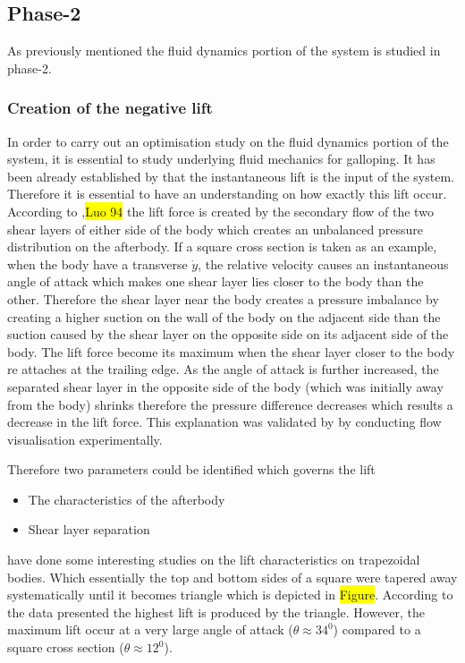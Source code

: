 \documentclass{article}
\newcommand{\hilight}[1]{\colorbox{yellow}{#1}}
\begin{document}
\subsection{Phase-2}

As previously mentioned the fluid dynamics portion of the system is studied in phase-2.

\subsubsection{Creation of the negative lift}

In order to carry out an optimisation study on the fluid dynamics portion of the system, it is essential to study underlying fluid mechanics for galloping. It has been already established by \cite{Parkinson1964} that the instantaneous lift is the input of the system. Therefore it is essential to have an understanding on how exactly this lift occur. According to \cite{Parkinson1989},\hilight{Luo 94} the lift force is created by the secondary flow of the two shear layers of either side of the body which creates an unbalanced pressure distribution on the afterbody. If a square cross section is taken as an example, when the body have a transverse $\dot{y}$, the relative velocity causes an instantaneous angle of attack which makes one shear layer lies closer to the body than the other. Therefore the shear layer near the body creates a pressure imbalance by creating a higher suction on the wall of the body on the adjacent side than the suction caused by the shear layer on the opposite side on its adjacent side of the body. The lift force become its maximum when the shear layer closer to the body re attaches at the trailing edge. As the angle of attack is further increased, the separated shear layer in the opposite side of the body (which was initially away from the body) shrinks therefore the pressure difference decreases which results a decrease in the lift force. This explanation was validated by \cite{Luo1994} by conducting flow visualisation experimentally.

Therefore two parameters could be identified which governs the lift 

\begin{itemize}
\item{ The characteristics of the afterbody}
\item{Shear layer separation}
\end{itemize}
\cite{Luo1994} have done some interesting studies on the lift characteristics on trapezoidal bodies. Which essentially the top and bottom sides of a square were tapered away systematically until it becomes triangle which is depicted in \hilight{Figure}. According to the data presented \cite{Luo1994} the highest lift is produced by the triangle. However, the maximum lift occur at a very large angle of attack ($\theta\approx 34^0 $) compared to a square cross section ($\theta\approx 12^0 $).
\end{document}
